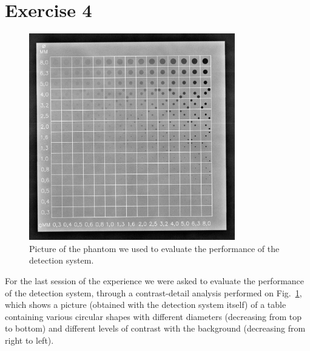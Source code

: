 \documentclass[a4paper]{article}
\begin{document}
\clearpage

\section*{Exercise 4}


\begin{figure}[h]
	\centering
	\includegraphics[width=0.8\textwidth]{./immagini_terza_prova/ex4/CDRAD-10_3.jpg}
  \caption{Picture of the phantom we used to evaluate the performance of the detection system.}
  \label{fig:phantom}
\end{figure}

For the last session of the experience we were asked to evaluate the performance of the detection system, through a contrast-detail analysis  performed on Fig.~\ref{fig:phantom}, which shows a picture (obtained with the detection system itself) of a table containing various circular shapes with different diameters (decreasing from top to bottom) and different levels of contrast with the background (decreasing from right to left).
\end{document}
